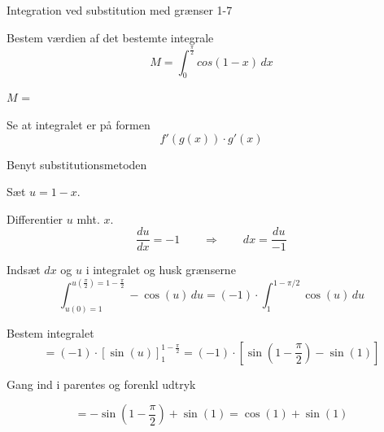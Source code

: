 \documentclass{article}
\begin{document}
\begin{exercise}{Integration ved substitution med grænser 1-7}
	
	
	Bestem værdien af det bestemte integrale
	\[
	M = \int_0^{\frac{\pi}{2}} cos(1-x) \, dx
	\]
	
	$M$ =  
	
	
	
	\hint
	
	Se at integralet er på formen
	\[
	f'(g(x)) \cdot g'(x)
	\]
	
	\hint
	
	Benyt substitutionsmetoden
	
	\hint
	
	Sæt $u=1-x$.
	
	
	\hint
	
	Differentier $u$ mht. $x$.
	\[
	\frac{du}{dx} = -1 \qquad	\Rightarrow \qquad dx = \frac{du}{-1}
	\]
	
	\hint
	
	Indsæt $dx$ og $u$ i integralet og husk grænserne
	\[
	\int_{u(0)=1}^{u(\frac{\pi}{2})=1-\frac{\pi}{2}} -\cos(u) \, du =  (-1) \cdot \int_1^{1-\pi/2} \cos(u) \, du
	\]
	
	\hint
	
	Bestem integralet
	\[
	= (-1) \cdot  \left[ \sin(u) \right]_1^{1-\frac{\pi}{2}} =  (-1) \cdot  \left[ \sin\left(1-\frac{\pi}{2}\right) - \sin(1) \right]
	\]
	
	
	\hint
	
	Gang ind i parentes og forenkl udtryk
	
	\hint
	
	\[
	= -\sin\left(1-\frac{\pi}{2}\right) + \sin(1) = \cos(1) + \sin(1)
	\]
	
	
\end{exercise}

\newpage
\end{document}
